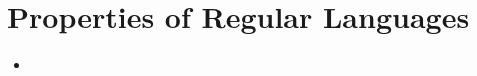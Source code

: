\documentclass[12pt]{article}
\begin{document}
\section{Properties of Regular Languages}
\begin{itemize}
    \item
\end{itemize}
\end{document}
